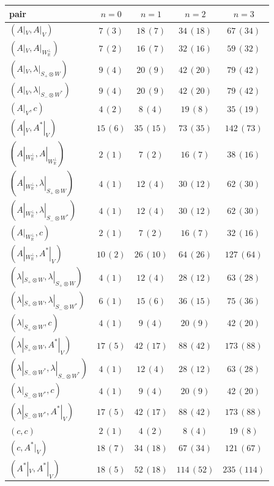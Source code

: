 \begin{tabular}{l|c|c|c|c}
pair & $n=0$ & $n=1$ & $n=2$ & $n=3$\\
\hline
$(A|_V,A|_V)$ & $7\,(3)$ & $18\,(7)$ & $34\,(18)$ & $67\,(34)$\\
$(A|_V,A|_{W_{\mathbb R}^\perp})$ & $7\,(2)$ & $16\,(7)$ & $32\,(16)$ & $59\,(32)$\\
$(A|_V,\lambda|_{S_+\otimes W})$ & $9\,(4)$ & $20\,(9)$ & $42\,(20)$ & $79\,(42)$\\
$(A|_V,\lambda|_{S_-\otimes W^*})$ & $9\,(4)$ & $20\,(9)$ & $42\,(20)$ & $79\,(42)$\\
$(A|_V,c)$ & $4\,(2)$ & $8\,(4)$ & $19\,(8)$ & $35\,(19)$\\
$(A|_V,A^*|_V)$ & $15\,(6)$ & $35\,(15)$ & $73\,(35)$ & $142\,(73)$\\
$(A|_{W_{\mathbb R}^\perp},A|_{W_{\mathbb R}^\perp})$ & $2\,(1)$ & $7\,(2)$ & $16\,(7)$ & $38\,(16)$\\
$(A|_{W_{\mathbb R}^\perp},\lambda|_{S_+\otimes W})$ & $4\,(1)$ & $12\,(4)$ & $30\,(12)$ & $62\,(30)$\\
$(A|_{W_{\mathbb R}^\perp},\lambda|_{S_-\otimes W^*})$ & $4\,(1)$ & $12\,(4)$ & $30\,(12)$ & $62\,(30)$\\
$(A|_{W_{\mathbb R}^\perp},c)$ & $2\,(1)$ & $7\,(2)$ & $16\,(7)$ & $32\,(16)$\\
$(A|_{W_{\mathbb R}^\perp},A^*|_V)$ & $10\,(2)$ & $26\,(10)$ & $64\,(26)$ & $127\,(64)$\\
$(\lambda|_{S_+\otimes W},\lambda|_{S_+\otimes W})$ & $4\,(1)$ & $12\,(4)$ & $28\,(12)$ & $63\,(28)$\\
$(\lambda|_{S_+\otimes W},\lambda|_{S_-\otimes W^*})$ & $6\,(1)$ & $15\,(6)$ & $36\,(15)$ & $75\,(36)$\\
$(\lambda|_{S_+\otimes W},c)$ & $4\,(1)$ & $9\,(4)$ & $20\,(9)$ & $42\,(20)$\\
$(\lambda|_{S_+\otimes W},A^*|_V)$ & $17\,(5)$ & $42\,(17)$ & $88\,(42)$ & $173\,(88)$\\
$(\lambda|_{S_-\otimes W^*},\lambda|_{S_-\otimes W^*})$ & $4\,(1)$ & $12\,(4)$ & $28\,(12)$ & $63\,(28)$\\
$(\lambda|_{S_-\otimes W^*},c)$ & $4\,(1)$ & $9\,(4)$ & $20\,(9)$ & $42\,(20)$\\
$(\lambda|_{S_-\otimes W^*},A^*|_V)$ & $17\,(5)$ & $42\,(17)$ & $88\,(42)$ & $173\,(88)$\\
$(c,c)$ & $2\,(1)$ & $4\,(2)$ & $8\,(4)$ & $19\,(8)$\\
$(c,A^*|_V)$ & $18\,(7)$ & $34\,(18)$ & $67\,(34)$ & $121\,(67)$\\
$(A^*|_V,A^*|_V)$ & $18\,(5)$ & $52\,(18)$ & $114\,(52)$ & $235\,(114)$\\
\end{tabular}

